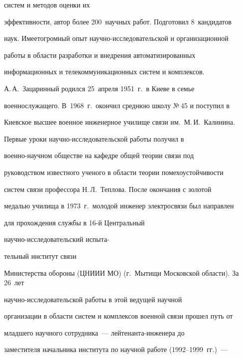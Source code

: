  сис\-тем и методов оценки их 


эффективности, \mbox{автор} более 200~научных работ. Подготовил 8~кандидатов 


наук. Имеет\linebreak огромный опыт на\-уч\-но-ис\-сле\-до\-ва\-тель\-ской и организационной\linebreak


работы в об\-ласти раз\-ра\-бот\-ки и внед\-ре\-ния автоматизированных 


информационных и телекоммуникационных сис\-тем и комплексов.





А.\,А.~Зацаринный родился 25~апреля 1951~г.\ в Киеве в семье 


военнослужащего. В~1968~г.\ окончил среднюю школу №\,45 и поступил в 


Киевское высшее военное инженерное училище связи им.\ М.\,И.~Калинина. 


Первые уроки на\-уч\-но-ис\-сле\-до\-ва\-тель\-ской работы получил в 


во\-ен\-но-на\-уч\-ном обществе на кафедре общей теории связи под 


руководством известного ученого в области теории помехоустойчивости 


сис\-тем связи профессора Н.\,Л.~Теплова. После окончания с золотой 


медалью училища в 1973~г.\ молодой инженер электросвязи был на\-прав\-лен 


для  прохождения службы в 16-й Центральный 


на\-уч\-но-ис\-сле\-до\-ва\-тель\-ский  испыта-\linebreak\vspace*{-12pt}


\pagebreak





\noindent


тельный институт связи 


Министерства обороны (ЦНИИИ МО) (г.~Мытищи Московской области). За 26~лет 


на\-уч\-но-ис\-сле\-до\-ва\-тель\-ской работы в этой ведущей научной 


организации в области сис\-тем и комплексов военной связи прошел путь от 


младшего научного сотрудника~--- лей\-те\-нан\-та-ин\-же\-не\-ра до 


за\-мес\-ти\-те\-ля начальника института по научной работе (1992--1999~гг.)~--- 


